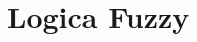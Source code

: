 \providecommand{\main}{.}








{\hypersetup{hidelinks}
	\tableofcontents  %
}

%

\chapter{Logica Fuzzy}



\appendix
%



